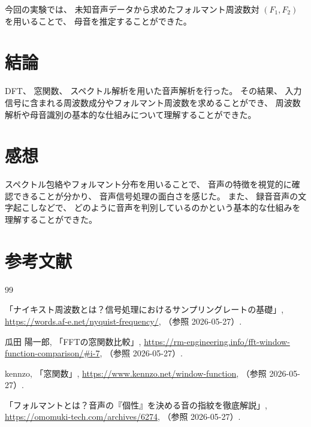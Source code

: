 \documentclass{jsarticle}
\begin{document}
今回の実験では、
未知音声データから求めたフォルマント周波数対 $(F_1,F_2)$ を用いることで、
母音を推定することができた。
\section{結論}
DFT、
窓関数、
スペクトル解析を用いた音声解析を行った。
その結果、
入力信号に含まれる周波数成分やフォルマント周波数を求めることができ、
周波数解析や母音識別の基本的な仕組みについて理解することができた。
\section{感想}
スペクトル包絡やフォルマント分布を用いることで、
音声の特徴を視覚的に確認できることが分かり、
音声信号処理の面白さを感じた。
また、
録音音声の文字起こしなどで、
どのように音声を判別しているのかという基本的な仕組みを理解することができた。
\section{参考文献}

\begin{thebibliography}{99}

「ナイキスト周波数とは？信号処理におけるサンプリングレートの基礎」,
\url{https://words.af-e.net/nyquist-frequency/},
（参照 2026-05-27）.

瓜田 陽一郎,
「FFTの窓関数比較」,
\url{https://rm-engineering.info/fft-window-function-comparison/#i-7},
（参照 2026-05-27）.

kennzo,
「窓関数」,
\url{https://www.kennzo.net/window-function},
（参照 2026-05-27）.

「フォルマントとは？音声の『個性』を決める音の指紋を徹底解説」,
\url{https://omomuki-tech.com/archives/6274},
（参照 2026-05-27）.
\end{thebibliography}
\end{document}
